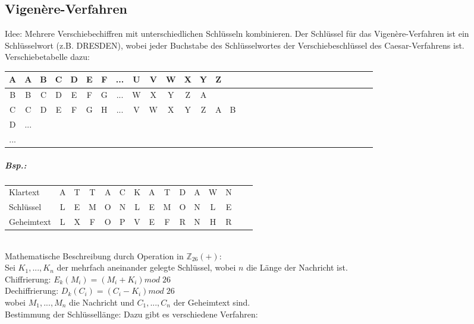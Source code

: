 \subsection{Vigenère-Verfahren}
Idee: Mehrere Verschiebechiffren mit unterschiedlichen Schlüsseln kombinieren. Der Schlüssel für das Vigenère-Verfahren ist ein Schlüsselwort (z.B. DRESDEN), wobei jeder Buchstabe des Schlüsselwortes der Verschiebeschlüssel des Caesar-Verfahrens ist.\\
Verschiebetabelle dazu:\\
\begin{tabular}{ c| c c c c c c c c c c c c c c c c c c c c c c c c c c c c c c}
A&A&B&C&D&E&F&...&U&V&W&X&Y&Z\\
\hline
B & B & C & D & E &F& G& ...   & W & X & Y & Z &A\\
C & C &D&E&F&G&H&...&V&W&X&Y&Z&A&B\\
D & ...\\
...
\end{tabular}
\subparagraph{Bsp.:} \parskp
\begin{tabular}{l c c c c c c c c c c c c c c }
Klartext & A&T&T&A&C&K&A&T&D&A&W&N\\
Schlüssel & L&E&M&O&N&L&E&M&O&N&L&E\\
Geheimtext & L&X&F&O&P&V&E&F&R&N&H&R
\end{tabular}\\
Mathematische Beschreibung durch Operation in $\mathbb{Z}_{26}(+)$:\\
Sei $K_1, ... ,K_n$ der mehrfach aneinander gelegte Schlüssel, wobei $n$ die Länge der Nachricht ist.\\
Chiffrierung: $E_k(M_i)=(M_i+K_i)mod\;26$\\
Dechiffrierung: $D_k(C_i)=(C_i-K_i)mod \; 26$\\
wobei $M_1, ..., M_n$ die Nachricht und $C_1, ..., C_n$ der Geheimtext sind.\\
Bestimmung der Schlüssellänge: Dazu gibt es verschiedene Verfahren:
